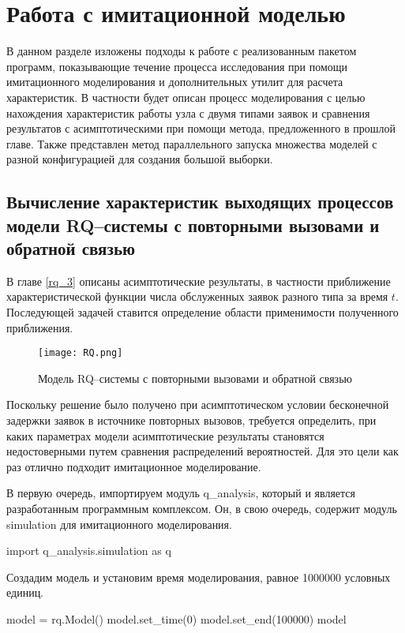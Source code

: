 \section{Работа с имитационной моделью}
В данном разделе изложены подходы к работе с реализованным пакетом программ, показывающие течение процесса исследования при помощи имитационного моделирования и дополнительных утилит для расчета характеристик. В частности будет описан процесс моделирования с целью нахождения характеристик работы узла с двумя типами заявок и сравнения результатов с асимптотическими при помощи метода, предложенного в прошлой главе. Также представлен метод параллельного запуска множества моделей с разной конфигурацией для создания большой выборки.
\subsection{Вычисление характеристик выходящих процессов модели RQ--системы с повторными вызовами и обратной связью}

В главе \ref{rq_3} описаны асимптотические результаты, в частности приближение характеристической функции числа обслуженных заявок разного типа за время $t$. Последующей задачей ставится определение области применимости полученного приближения. 

\begin{figure}[H]
	\centering
	\texttt{[image: RQ.png]}
	\caption{Модель RQ--системы с повторными вызовами и обратной связью} \label{rq_system}
\end{figure}

Поскольку решение было получено при асимптотическом условии бесконечной задержки заявок в источнике повторных вызовов, требуется определить, при каких параметрах модели асимптотические результаты становятся недостоверными путем сравнения распределений вероятностей. Для это цели как раз отлично подходит имитационное моделирование.

В первую очередь, импортируем модуль q\_analysis, который и является разработанным программным комплексом. Он, в свою очередь, содержит модуль simulation для имитационного моделирования.
\begin{pyin}
	import q_analysis.simulation as q
\end{pyin}
Создадим модель и установим время моделирования, равное 1000000 условных единиц.
\begin{pyin} 
model = rq.Model()
model.set_time(0) 
model.set_end(100000)
model
\end{pyin}

